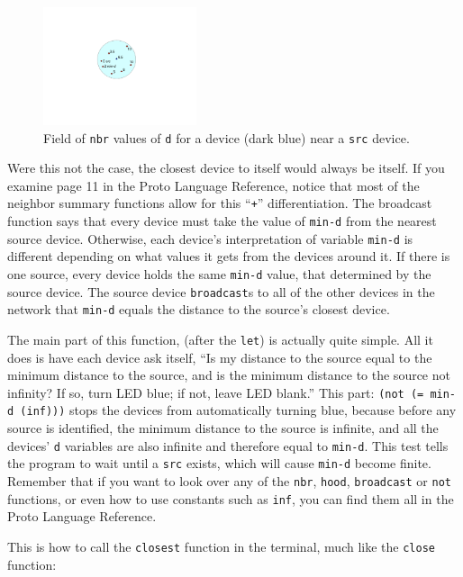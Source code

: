 \documentclass{article}
\newcommand\var[1]{{\tt #1}}
\newcommand\qvar[1]{``{\tt #1}''}
\begin{document}
\begin{figure}[ht]
  \centering
  \includegraphics[width=0.4\textwidth]{figures/nbr-d.pdf}
  \caption{Field of \var{nbr} values of \var{d} for a device (dark
    blue) near a \var{src} device.}
  \label{f:nbrd}
\end{figure}

Were this not the case, the closest device to itself would always be
itself.  If you examine page 11 in the Proto Language Reference,
notice that most of the neighbor summary functions allow for this
\qvar{+} differentiation.  The broadcast function says that every
device must take the value of \var{min-d} from the nearest source
device.  Otherwise, each device's interpretation of variable
\var{min-d} is different depending on what values it gets from the
devices around it.  If there is one source, every device holds the
same \var{min-d} value, that determined by the source device.  The
source device \var{broadcast}s to all of the other devices in the
network that \var{min-d} equals the distance to the source's closest
device.

The main part of this function, (after the \var{let}) is actually
quite simple.  All it does is have each device ask itself, ``Is my
distance to the source equal to the minimum distance to the source,
and is the minimum distance to the source not infinity? If so, turn
LED blue; if not, leave LED blank.''  This part: \var{(not (= min-d
  (inf)))} stops the devices from automatically turning blue, because
before any source is identified, the minimum distance to the source is
infinite, and all the devices' \var{d} variables are also infinite and
therefore equal to \var{min-d}.  This test tells the program to wait
until a \var{src} exists, which will cause \var{min-d} become finite.
Remember that if you want to look over any of the \var{nbr},
\var{hood}, \var{broadcast} or \var{not} functions, or even how to
use constants such as \var{inf}, you can find them all in the Proto
Language Reference.

This is how to call the \var{closest} function in the terminal, much like
the \var{close} function:
\end{document}
